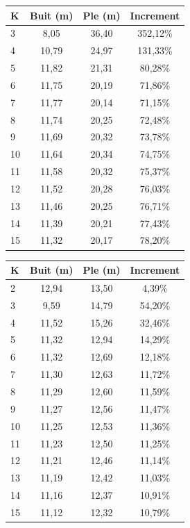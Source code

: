 \begin{table}[h]
  \begin{center}
      \begin{tabular}{|l|c|c|c|}
        \hline
        \cellcolor[gray]{0.9} K & \cellcolor[gray]{0.9} Buit (m) & \cellcolor[gray]{0.9} Ple (m) & \cellcolor[gray]{0.9} Increment \\ \hline
        
        3  & 8,05  & 36,40 & 352,12\% \\
        4  & 10,79 & 24,97 & 131,33\% \\
        5  & 11,82 & 21,31 & 80,28\%  \\
        6  & 11,75 & 20,19 & 71,86\%  \\
        7  & 11,77 & 20,14 & 71,15\%  \\
        8  & 11,74 & 20,25 & 72,48\%  \\
        9  & 11,69 & 20,32 & 73,78\%  \\
        10 & 11,64 & 20,34 & 74,75\%  \\
        11 & 11,58 & 20,32 & 75,37\%  \\
        12 & 11,52 & 20,28 & 76,03\%  \\
        13 & 11,46 & 20,25 & 76,71\%  \\
        14 & 11,39 & 20,21 & 77,43\%  \\
        15 & 11,32 & 20,17 & 78,20\%  \\ \hline

      \end{tabular}
      
      \hspace{10pt}
      
      \begin{tabular}{|l|c|c|c|}
        \hline
        \cellcolor[gray]{0.9} K & \cellcolor[gray]{0.9} Buit (m) & \cellcolor[gray]{0.9} Ple (m) & \cellcolor[gray]{0.9} Increment \\ \hline
        
        2  & 12,94 & 13,50 & 4,39\%  \\
        3  & 9,59  & 14,79 & 54,20\% \\
        4  & 11,52 & 15,26 & 32,46\% \\
        5  & 11,32 & 12,94 & 14,29\% \\
        6  & 11,32 & 12,69 & 12,18\% \\
        7  & 11,30 & 12,63 & 11,72\% \\
        8  & 11,29 & 12,60 & 11,59\% \\
        9  & 11,27 & 12,56 & 11,47\% \\
        10 & 11,25 & 12,53 & 11,36\% \\
        11 & 11,23 & 12,50 & 11,25\% \\
        12 & 11,21 & 12,46 & 11,14\% \\
        13 & 11,19 & 12,42 & 11,03\% \\
        14 & 11,16 & 12,37 & 10,91\% \\
        15 & 11,12 & 12,32 & 10,79\% \\ \hline


\end{tabular}
\end{center}
\end{table}
